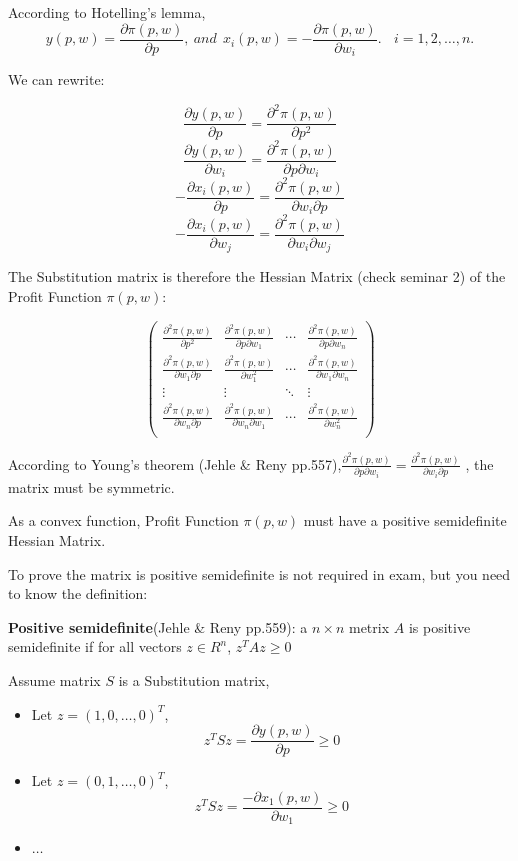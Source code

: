 \documentclass{article}
\begin{document}
\begin{mdframed}[backgroundcolor=blue!20,linecolor=white]

According to Hotelling's lemma,
$$y(p,w) = \frac{\partial \pi(p,w)}{\partial p},\ and \ \ x_i(p,w) = - \frac{\partial \pi(p,w)}{\partial w_i}. \ \ \ \ i = 1,2, \dots , n.$$

We can rewrite:

$$\frac{\partial y(p,w)}{\partial p} = \frac{\partial^2 \pi(p,w)}{\partial p^2}$$
$$\frac{\partial y(p,w)}{\partial w_i} = \frac{\partial^2 \pi(p,w)}{\partial p \partial w_i}$$
$$-\frac{\partial x_i(p,w)}{\partial p} = \frac{\partial^2 \pi(p,w)}{\partial w_i \partial p }$$
$$-\frac{\partial x_i(p,w)}{\partial w_j} = \frac{\partial^2 \pi(p,w)}{\partial w_i \partial w_j}$$

The Substitution matrix is therefore the Hessian Matrix (check seminar 2) of the Profit Function $\pi(p,w)$:

\begin{equation}
\left(
    \begin{array}{cccc}
    \frac{\partial^2 \pi(p,w)}{\partial p^2} & \frac{\partial^2 \pi(p,w)}{\partial p \partial w_1} & \cdots & \frac{\partial^2 \pi(p,w)}{\partial p \partial w_n} \\
    \frac{\partial^2 \pi(p,w)}{\partial w_1 \partial p } & \frac{\partial^2 \pi(p,w)}{\partial w_1^2} & \cdots & \frac{\partial^2 \pi(p,w)}{\partial w_1 \partial w_n} \\
    \vdots    &    \vdots & \ddots &   \vdots \\
    \frac{\partial^2 \pi(p,w)}{\partial w_n \partial p } &  \frac{\partial^2 \pi(p,w)}{\partial w_n \partial w_1} & \cdots &  \frac{\partial^2 \pi(p,w)}{\partial w_n^2} \\
    \end{array}
    \right)
\label{eq:subst_s}   
\end{equation}


According to Young's theorem (Jehle \& Reny pp.557),$\frac{\partial^2 \pi(p,w)}{\partial p \partial w_i} = \frac{\partial^2 \pi(p,w)}{\partial w_i \partial p }$ , the matrix must be symmetric.

As a convex function, Profit Function $\pi(p,w)$ must have a positive semidefinite Hessian Matrix.

To prove the matrix is positive semideﬁnite is not required in exam, but you need to know the definition:

\textbf{Positive semidefinite}(Jehle \& Reny pp.559): a $n \times n$ metrix $A$ is positive semidefinite if for
all vectors $z \in R^n$, $z^TAz \ge 0$

Assume matrix $S$ is a Substitution matrix,
\begin{itemize}
\item Let $z = (1,0 , \dots, 0)^T$, $$z^T S z = \frac{\partial y(p,w)}{\partial p} \ge 0$$
\item Let $z = (0,1 , \dots, 0)^T$, $$z^T S z = \frac{-\partial x_1(p,w)}{\partial w_1}  \ge 0$$
\item $\dots$
\end{itemize}

\end{mdframed}
\end{document}
